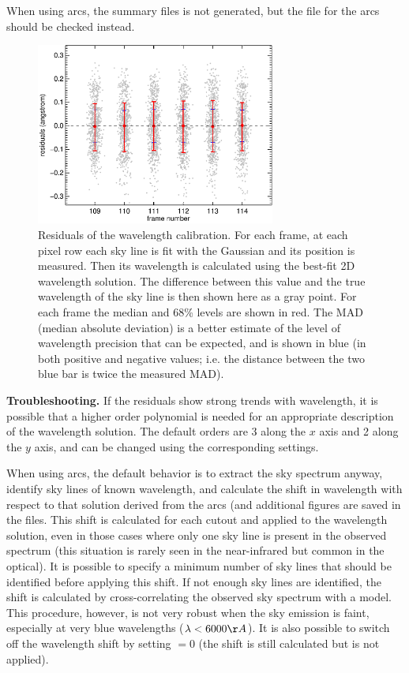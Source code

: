 \documentclass[a4paper]{article}
\begin{document}
\begin{sloppypar}
When using arcs, the summary files is not generated, but the  file for the arcs should be checked instead.

\begin{figure}[tbp]
\centering
\includegraphics[width=0.7\textwidth]{residuals}
\caption{Residuals of the wavelength calibration. For each frame, at each pixel row each sky line is fit with the Gaussian and its position is measured. Then its wavelength is calculated using the best-fit 2D wavelength solution. The difference between this value and the true wavelength of the sky line is then shown here as a gray point. For each frame the median and 68\% levels are shown in red. The MAD (median absolute deviation) is a better estimate of the level of wavelength precision that can be expected, and is shown in blue (in both positive and negative values; i.e. the distance between the two blue bar is twice the measured MAD).}
\label{fig:residuals}
\end{figure}


\medskip
\noindent
\textbf{Troubleshooting.} If the residuals show strong trends with wavelength, it is possible that a higher order polynomial is needed for an appropriate description of the wavelength solution. The default orders are 3 along the $x$ axis and 2 along the $y$ axis, and can be changed using the corresponding settings.

When using arcs, the default behavior is to extract the sky spectrum anyway, identify sky lines of known wavelength, and calculate the shift in wavelength with respect to that solution derived from the arcs (and additional figures are saved in the  files. This shift is calculated for each cutout and applied to the wavelength solution, even in those cases where only one sky line is present in the observed spectrum (this situation is rarely seen in the near-infrared but common in the optical). It is possible to specify a minimum number of sky lines that should be identified before applying this shift. If not enough sky lines are identified, the shift is calculated by cross-correlating the observed sky spectrum with a model. This procedure, however, is not very robust when the sky emission is faint, especially at very blue wavelengths ($\lambda < 6000\AA$). It is also possible to switch off the wavelength shift by setting $=0$ (the shift is still calculated but is not applied).



\end{sloppypar}
\end{document}
